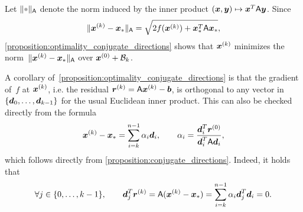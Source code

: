 \begin{remark}
    Let $\norm{\placeholder}_{\mat A}$ denote the norm induced by the inner product $(\mathbf{\boldsymbol{x}}, \mathbf{\boldsymbol{y}}) \mapsto \mathbf{\boldsymbol{x}}^T \mathsf A \mathbf{\boldsymbol{y}}$.
    Since
    \[
        \lVert\mathbf{\boldsymbol{x}}^{(k)} - \mathbf{\boldsymbol{x}}_*\rVert_{\mathsf A} = \sqrt{2f(\mathbf{\boldsymbol{x}}^{(k)}) + \mathbf{\boldsymbol{x}}_*^T \mathsf A \mathbf{\boldsymbol{x}}_*},
    \]
    \cref{proposition:optimality_conjugate_directions} shows that $\mathbf{\boldsymbol{x}}^{(k)}$ minimizes the norm~$\lVert\mathbf{\boldsymbol{x}}^{(k)} - \mathbf{\boldsymbol{x}}_*\rVert_{\mathsf A}$
    over $\mathbf{\boldsymbol{x}}^{(0)} + \mathcal  B_k$.
\end{remark}

A corollary of~\eqref{proposition:optimality_conjugate_directions} is that the gradient of~$f$ at $\mathbf{\boldsymbol{x}}^{(k)}$,
i.e. the residual $\mathbf{\boldsymbol{r}}^{(k)} = \mathsf A \mathbf{\boldsymbol{x}}^{(k)} - \mathbf{\boldsymbol{b}}$,
is orthogonal to any vector in $\{\mathbf{\boldsymbol{d}}_0, \dotsc, \mathbf{\boldsymbol{d}}_{k-1} \}$ for the usual Euclidean inner product.
This can also be checked directly from the formula
\[
    \mathbf{\boldsymbol{x}}^{(k)} - \mathbf{\boldsymbol{x}}_* = \sum_{i=k}^{n-1} \alpha_i \mathbf{\boldsymbol{d}}_i,
    \qquad \alpha_i = \frac{\mathbf{\boldsymbol{d}}_i^T \mathbf{\boldsymbol{r}}^{(0)}}{\mathbf{\boldsymbol{d}}_i^T \mathsf A \mathbf{\boldsymbol{d}}_i},
\]
which follows directly from \cref{proposition:conjugate_directions}.
Indeed, it holds that
\begin{equation}
    \label{eq:orthogonality_residual}
    \forall j \in \{0, \dotsc, k-1\}, \qquad
    \mathbf{\boldsymbol{d}}_j^T \mathbf{\boldsymbol{r}}^{(k)} = \mathsf A (\mathbf{\boldsymbol{x}}^{(k)} - \mathbf{\boldsymbol{x}}_*)
    = \sum_{i=k}^{n-1} \alpha_i \mathbf{\boldsymbol{d}}_j^T \mathbf{\boldsymbol{d}}_i = 0.
\end{equation}

